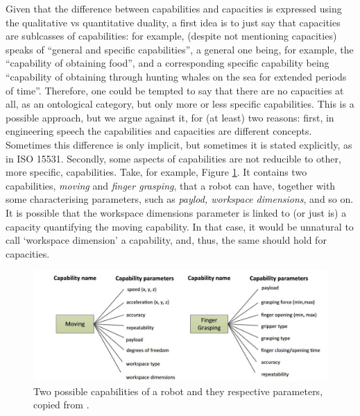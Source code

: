 \documentclass[sw]{iosart2x}
\newcommand{\quotes}[1]{`#1'}
\newcommand{\qquotes}[1]{``#1''}
\newcommand{\TODO}[1]{{\color{red} #1
}}
\begin{document}
Given that the difference between capabilities and capacities is expressed using the qualitative vs quantitative duality, a first idea is to just say that capacities are sublcasses of capabilities: for example, \cite{kochCAPABILITIESBASEDACCOUNTPATIENT2016} (despite not mentioning capacities) speaks of \qquotes{general and specific capabilities}, a general one being, for example, the \qquotes{capability of obtaining food}, and a corresponding specific capability being \qquotes{capability of obtaining through hunting whales on the sea for extended periods of time}. 
Therefore, one could be tempted to say that there are no capacities at all, as an ontological category, but only more or less specific capabilities.
This is a possible approach, but we argue against it, for (at least) two reasons: first, in engineering speech the capabilities and capacities are different concepts. Sometimes this difference is only implicit, but sometimes it is stated explicitly, as in ISO 15531.
Secondly, some aspects of capabilities are not reducible to other, more specific, capabilities.
Take, for example, Figure \ref{fig:capability-parameters}. 
It contains two capabilities, \textit{moving} and \textit{finger grasping}, that a robot can have, together with some characterising parameters, such as \textit{paylod, workspace dimensions}, and so on. 
It is possible that the workspace dimensions parameter is linked to (or just is) a capacity quantifying the moving capability. In that case, it would be unnatural to call \quotes{workspace dimension} a capability, and, thus, the same should hold for capacities.%

\begin{figure}
  \centering
  \includegraphics[width=\textwidth]{capability-parameters.JPG}
  \caption{\label{fig:capability-parameters} Two possible capabilities of a robot and they respective parameters, copied from \cite{jarvenpaaDevelopmentOntologyDescribing2019a}.}%
\end{figure}
\end{document}
